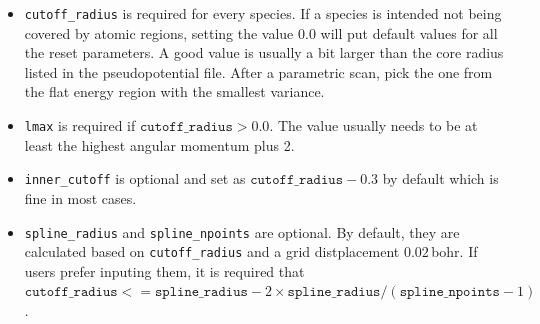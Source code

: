 \begin{itemize}
  \item \texttt{cutoff\_radius} is required for every species. If a species is intended not being covered by atomic regions, setting the value 0.0 will put default values for all the reset parameters. A good value is usually a bit larger than the core radius listed in the pseudopotential file. After a parametric scan, pick the one from the flat energy region with the smallest variance.
  \item \texttt{lmax} is required if $\texttt{cutoff\_radius} > 0.0$. The value usually needs to be at least the highest angular momentum plus 2.
  \item \texttt{inner\_cutoff} is optional and set as $\texttt{cutoff\_radius}-0.3$ by default which is fine in most cases.
  \item \texttt{spline\_radius} and \texttt{spline\_npoints} are optional. By default, they are calculated based on \texttt{cutoff\_radius} and a grid distplacement $0.02$\,bohr.
        If users prefer inputing them, it is required that $\texttt{cutoff\_radius}<=\texttt{spline\_radius}-2\times\texttt{spline\_radius}/(\texttt{spline\_npoints}-1)$.
\end{itemize}
